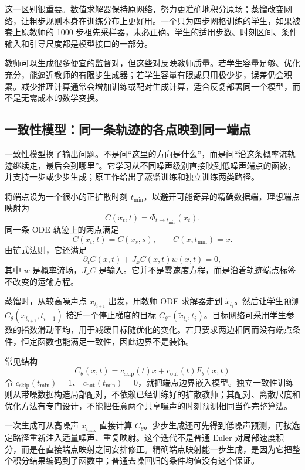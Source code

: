 这一区别很重要。数值求解器保持原网络，努力更准确地积分原场；蒸馏改变网络，让粗步规则本身在训练分布上更好用。一个只为四步网格训练的学生，如果被套上原教师的 1000 步祖先采样器，未必正确。学生的适用步数、时刻区间、条件输入和引导尺度都是模型接口的一部分。

教师可以生成很多便宜的监督对，但这些对反映教师质量。若学生容量足够、优化充分，能逼近教师的有限步生成器；若学生容量有限或只用极少步，误差仍会积累。减少推理计算通常会增加训练或配对生成计算，适合反复部署同一个模型，而不是无需成本的数学变换。

\subsection{一致性模型：同一条轨迹的各点映到同一端点}

一致性模型换了输出问题。不是问“这里的方向是什么”，而是问“沿这条概率流轨迹继续走，最后会到哪里”。它学习从不同噪声级别直接映到低噪声端点的函数，并支持一步或少步生成；原工作给出了蒸馏训练和独立训练两类路径。\cite{m_consistency}

将端点设为一个很小的正扩散时刻 $t_{\min}$，以避开可能奇异的精确数据端，理想端点映射为
\[
 C(x_t,t)=\Phi_{t\to t_{\min}}(x_t).
\]
同一条 ODE 轨迹上的两点满足
\begin{equation}
C(x_t,t)=C(x_s,s),\qquad
C(x,t_{\min})=x.
\label{eq:m-consistency}
\end{equation}
由链式法则，它还满足
\[
 \partial_tC(x,t)+J_xC(x,t)w(x,t)=0,
\]
其中 $w$ 是概率流场，$J_xC$ 是输入。它并不是零速度方程，而是沿着轨迹端点标签不改变的运输方程。

蒸馏时，从较高噪声点 $x_{t_{i+1}}$ 出发，用教师 ODE 求解器走到
$\widetilde x_{t_i}$。然后让学生预测
$C_\theta(x_{t_{i+1}},t_{i+1})$ 接近一个停止梯度的目标
$C_{\theta^-}(\widetilde x_{t_i},t_i)$。目标网络可采用学生参数的指数滑动平均，用于减缓目标随优化的变化。若只要求两边相同而没有端点条件，恒定函数也能满足一致性，因此边界不是装饰。

常见结构
\[
 C_\theta(x,t)=c_{\mathrm{skip}}(t)x+
 c_{\mathrm{out}}(t)F_\theta(x,t)
\]
令 $c_{\mathrm{skip}}(t_{\min})=1$、
$c_{\mathrm{out}}(t_{\min})=0$，就把端点边界嵌入模型。独立一致性训练则从带噪数据构造局部配对，不依赖已经训练好的扩散教师；其配对、离散尺度和优化方法有专门设计，不能把任意两个共享噪声的时刻预测相同当作完整算法。

一次生成可从高噪声 $x_{t_{\max}}$ 直接计算 $C_\theta$。少步生成还可先得到低噪声预测，再按选定路径重新注入适量噪声、重复映射。这个迭代不是普通 Euler 对局部速度积分，而是在直接端点映射之间安排修正。精确端点映射能一步生成，是因为它把整个积分结果编码到了函数中；普通去噪回归的条件均值没有这个保证。

